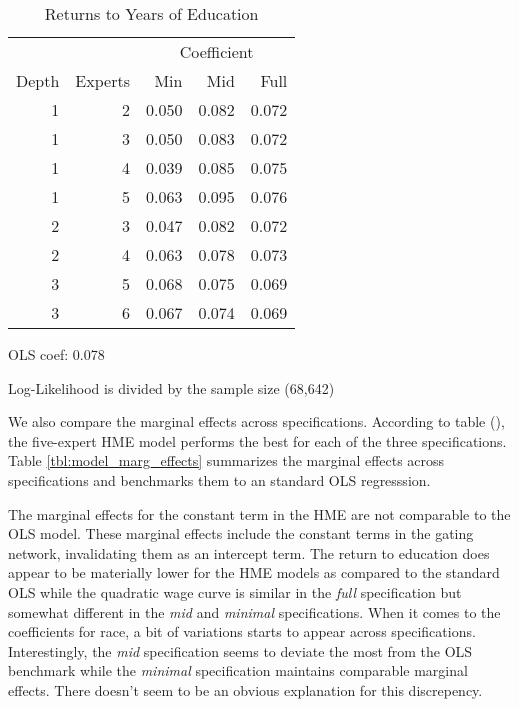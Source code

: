 \documentclass[12pt]{article}
\begin{document}
\begin{table} \centering
  \caption{Returns to Years of Education}
  \begin{threeparttable}
    \begin{tabular}[l]{r r r r r}
  \cmidrule{1-5}
        &         & \multicolumn{3}{c}{Coefficient} \\ 
  \cmidrule(r){3-5}
  Depth & Experts & Min   & Mid   & Full       \\
  \cmidrule{1-5}

  1     & 2       & 0.050 & 0.082 & 0.072      \\
  1     & 3       & 0.050 & 0.083 & 0.072      \\
  1     & 4       & 0.039 & 0.085 & 0.075      \\
  1     & 5       & 0.063 & 0.095 & 0.076      \\
  2     & 3       & 0.047 & 0.082 & 0.072      \\
  2     & 4       & 0.063 & 0.078 & 0.073      \\
  3     & 5       & 0.068 & 0.075 & 0.069      \\
  3     & 6       & 0.067 & 0.074 & 0.069      \\

  \hline
    \end{tabular}
    \begin{tablenotes}
      \item{\footnotesize OLS coef: 0.078}
      \item{\footnotesize Log-Likelihood is divided by the sample size (68,642)}
    \end{tablenotes} \label{tbl:YrsEdu_coef}
  \end{threeparttable}
\end{table}

We also compare the marginal effects across specifications. According to table
(), the five-expert HME model performs the best for each
of the three specifications. Table \ref{tbl:model_marg_effects} summarizes
the marginal effects across specifications and benchmarks them to an standard
OLS regresssion.

The marginal effects for the constant term in the HME are not comparable
to the OLS model. These marginal effects include the constant terms in the
gating network, invalidating them as an intercept term. The return to
education does appear to be materially lower for the HME models as
compared to the standard OLS while the quadratic wage curve is similar
in the \textit{full} specification but somewhat different in the
\textit{mid} and \textit{minimal} specifications. When it comes to
the coefficients for race, a bit of variations starts to appear
across specifications. Interestingly, the \textit{mid} specification
seems to deviate the most from the OLS benchmark while the
\textit{minimal} specification maintains comparable marginal effects.
There doesn't seem to be an obvious explanation for this discrepency. 
\end{document}
